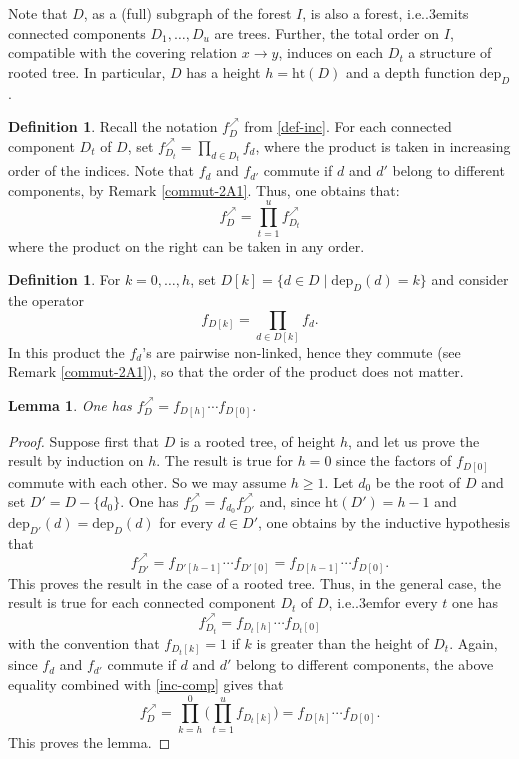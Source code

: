 \documentclass[12pt]{amsart}
\numberwithin{equation}{section}
\newtheorem{lem}[thm]{Lemma}
\theoremstyle{definition}
\newtheorem{defin}[thm]{Definition}
\def\ie{{i.e.}\kern.3em}
\def\dep{\mathrm{dep}} %
\def\haut{\mathrm{ht}} %
\def\nea{{\scriptscriptstyle\nearrow}}
\begin{document}
Note that $D$, as a (full) subgraph of the forest $I$, is also a forest, \ie its connected components 
$D_1,\dots, D_u$ are trees. Further,  the total order on $I$, compatible with the covering relation $x\to y$, 
induces on each $D_t$ a structure of rooted tree. 
In particular, $D$ has a height $h = \haut(D)$ and a depth function $\dep_D$. 

\begin{defin} Recall the notation $f_D^\nea $ from {\rm \ref{def-inc}}. For each connected component 
$D_t$ of $D$, set $f_{D_t}^\nea = \prod_{d\in D_t} f_d$, 
where the product is taken in increasing order of the indices. Note that $f_d$ and $f_{d'}$ commute if 
$d$ and $d'$ belong to different components, by Remark \ref{commut-2A1}. 
Thus, one obtains that: 
\begin{equation}\label{inc-comp}
f_D^\nea = \prod_{t= 1}^u f_{D_t}^\nea 
\end{equation} 
where the product on the right can be taken in any order. 
\end{defin} 



\begin{defin} For $k= 0,\dots, h$, set $D[k] = \{d \in D \mid \dep_D(d) = k\}$ and consider 
the operator
\begin{equation} 
f_{D[k]} = \prod_{d \in D[k]} f_d. 
\end{equation} 
In this product the $f_d$'s are pairwise non-linked, hence they commute (see Remark \ref{commut-2A1}), 
so that the order of the product does not matter. 
\end{defin} 



\begin{lem}\label{prod-by-depth}  
One has $f_D^\nea  = f_{D[h]} \cdots f_{D[0]}$. 
\end{lem}

\begin{proof} Suppose first that $D$ is a rooted tree, of height $h$, and let us prove the result by induction on $h$. 
The result is true for $h=0$ since the factors of 
$f_{D[0]}$ commute with each other. So we may assume $h\geq 1$. Let $d_0$ be  the root of 
$D$ and set $D' = D -\{d_0\}$. One has $f_D^\nea = f_{d_0} f_{D'}^\nea$ and, since 
$\haut(D') = h-1$ and $\dep_{D'}(d) = \dep_{D}(d)$ for every $d\in D'$, one obtains by the inductive hypothesis 
that 
$$
 f_{D'}^\nea = f_{D'[h-1]} \cdots f_{D'[0]} = f_{D[h-1]} \cdots f_{D[0]} . 
$$
This proves the result in the case of a rooted tree. Thus, in  the general case, the result is true for each connected 
component $D_t$ of $D$, \ie for every $t$ one has 
$$
f_{D_t}^\nea = f_{D_t[h]} \cdots f_{D_t[0]} 
$$
with the convention that $f_{D_t[k]} = 1$ if $k$ is greater than the height of $D_t$. Again, since $f_d$ and $f_{d'}$ commute if $d$ and $d'$ belong to different components, the above equality combined with \eqref{inc-comp} 
gives that 
$$
f_D^\nea = \prod_{k = h}^0 \Big( \prod_{t=1}^u f_{D_t[k]} \Big) = f_{D[h]} \cdots f_{D[0]}. 
$$
This proves the lemma. 
\end{proof} 
\end{document}
